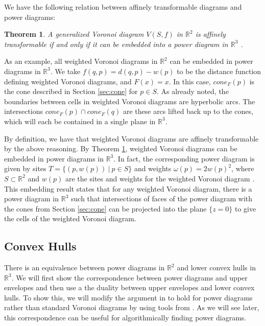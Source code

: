 \documentclass[a4paper, 11pt]{article}
\newtheorem{theorem}{Theorem}[section]
\newcommand{\R}{\mathbb{R}}
\begin{document}
We have the following relation between affinely transformable diagrams and power diagrams:

\begin{theorem}
  \label{thm:affine}
  A generalized Voronoi diagram $V(S,f)$ in $\R^2$ is affinely transformable if and only if it can be embedded into a power diagram in $\R^3$
  \cite{aurenhammer_additive}.
\end{theorem}

As an example, all weighted Voronoi diagrams in $\R^2$ can be embedded in power diagrams in $\R^3$. We take $f(q,p) = d(q,p) - w(p)$ to be the
distance function defining weighted Voronoi diagrams, and $F(x) = x$. In this case, $cone_F(p)$ is the cone described in Section \ref{sec:cone} for $p \in
S$. As already noted, the boundaries between cells in weighted Voronoi diagrams are hyperbolic arcs. The intersections $cone_F(p) \cap cone_F(q)$
are these arcs lifted back up to
the cones, which will each be contained in a single plane in $\R^3$.

By definition, we have that weighted Voronoi diagrams are affinely transformable by the above reasoning. By Theorem \ref{thm:affine}, weighted Voronoi
diagrams can be embedded in power diagrams in $\R^3$. In fact, the corresponding power diagram is given by sites $T = \{ (p, w(p)) \ | \ p \in S \}$ and
weights $\omega(p) = 2 w(p)^2$, where $S \subset \R^2$ and $w(p)$ are the sites and weights for the weighted Voronoi diagram
\cite{aurenhammer_additive}. This embedding result states that for any weighted Voronoi diagram, there is a power diagram in $\R^3$ such that
intersections of faces of the power diagram with the cones from Section \ref{sec:cone} can be projected into the plane $\{ z = 0 \}$ to give the
cells of the weighted Voronoi diagram.

\subsection{Convex Hulls}
\label{sec:conv}

There is an equivalence between power diagrams in $\R^2$ and lower convex hulls in $\R^3$. We will first show the correspondence between power diagrams and
upper envelopes and then use a the duality between upper envelopes and lower convex hulls. To show this, we will modify the argument in
\cite{comp_geom} to hold for power diagrams rather than standard Voronoi diagrams by using tools from \cite{aurenhammer_power}. As we will see later, this correspondence can be useful
for algorithmically finding power diagrams.
\end{document}
